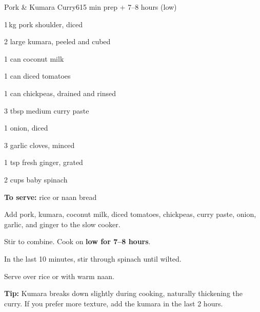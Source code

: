 \begin{recipebox}{Pork \& Kumara Curry}{6}{15 min prep + 7--8 hours (low)}
\begin{ingredients}
  \item 1\,kg pork shoulder, diced
  \item 2 large kumara, peeled and cubed
  \item 1 can coconut milk
  \item 1 can diced tomatoes
  \item 1 can chickpeas, drained and rinsed
  \item 3 tbsp medium curry paste
  \item 1 onion, diced
  \item 3 garlic cloves, minced
  \item 1 tsp fresh ginger, grated
  \item 2 cups baby spinach
  \item \textbf{To serve:} rice or naan bread
\end{ingredients}

\begin{method}
  \item Add pork, kumara, coconut milk, diced tomatoes, chickpeas, curry paste, onion, garlic, and ginger to the slow cooker.
  \item Stir to combine. Cook on \textbf{low for 7--8 hours}.
  \item In the last 10 minutes, stir through spinach until wilted.
  \item Serve over rice or with warm naan.
\end{method}

\begin{notelist}
  \item \textbf{Tip:} Kumara breaks down slightly during cooking, naturally thickening the curry. If you prefer more texture, add the kumara in the last 2 hours.
\end{notelist}
\end{recipebox}
